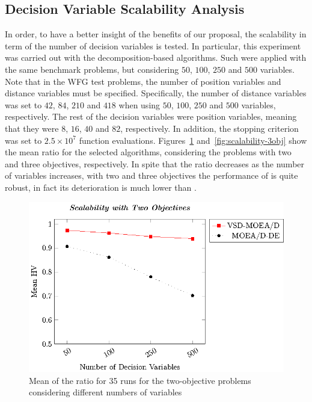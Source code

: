 \subsection{Decision Variable Scalability Analysis}

In order, to have a better insight of the benefits of our proposal, the scalability in term of the number of decision variables is tested.
%
In particular, this experiment was carried out with the decomposition-based algorithms.
%
Such \MOEAS{} were applied with the same benchmark problems, but considering $50$, $100$, $250$ and $500$ variables.
%
Note that in the WFG test problems, the number of position variables and distance variables must be specified.
%
Specifically, the number of distance variables was set to $42$, $84$, $210$ and $418$ when using $50$, $100$, $250$ and $500$ variables, respectively.
%
The rest of the decision variables were position variables, meaning that they were $8$, $16$, $40$ and $82$, respectively.
%
In addition, the stopping criterion was set to $2.5 \times 10^7$ function evaluations.
%
Figures~\ref{fig:scalability-2obj} and~\ref{fig:scalability-3obj} show the mean \HV{} ratio for the selected algorithms, considering the problems with two and three objectives, respectively.
%
In spite that the \HV{} ratio decreases as the number of variables increases, with two and three objectives the performance of \AVSDMOEAD{} is quite robust, in fact its deterioration is much lower than \MOEADDE{}.
%

\begin{figure}[t]
\centering
\includegraphics[scale=0.85]{images/Graphic-Scalability-2obj_tikz-figure0.eps}
\caption{Mean of the \HV{} ratio for 35 runs for the two-objective problems considering different numbers of variables}\label{fig:scalability-2obj}
\end{figure}

